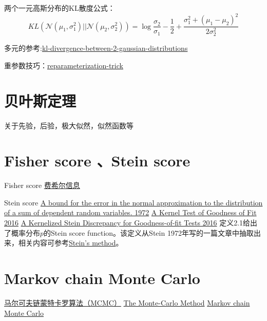 两个一元高斯分布的KL散度公式：
\begin{equation}
K L\left(\mathcal{N}\left(\mu_1, \sigma_1^2\right)||
\mathcal{N}\left(\mu_2, \sigma_2^2\right)\right)=
\log \frac{\sigma_2}{\sigma_1}-\frac{1}{2}+\frac{\sigma_1^2+
\left(\mu_1-\mu_2\right)^2}{2 \sigma_2^2}
\end{equation}

多元的参考:\href{https://mr-easy.github.io/2020-04-16-kl-divergence-between-2-gaussian-distributions/}{kl-divergence-between-2-gaussian-distributions}

重参数技巧：\href{https://lilianweng.github.io/posts/2018-08-12-vae/#reparameterization-trick}{reparameterization-trick}

\section{贝叶斯定理}
关于先验，后验，极大似然，似然函数等

\section{Fisher score 、Stein score}
Fisher score
\href{https://zh.wikipedia.org/wiki/%E8%B4%B9%E5%B8%8C%E5%B0%94%E4%BF%A1%E6%81%AF}{费希尔信息}

Stein score
\href{https://projecteuclid.org/ebooks/berkeley-symposium-on-mathematical-statistics-and-probability/Proceedings-of-the-Sixth-Berkeley-Symposium-on-Mathematical-Statistics-and/chapter/A-bound-for-the-error-in-the-normal-approximation-to/bsmsp/1200514239}{A bound for the error in the normal approximation to
the distribution of a sum of dependent random variables. 1972}
\href{http://proceedings.mlr.press/v48/chwialkowski16.pdf}{A Kernel Test of Goodness of Fit 2016}
\href{https://arxiv.org/pdf/1602.03253.pdf}{A Kernelized Stein Discrepancy for Goodness-of-fit Tests 2016}
定义2.1给出了概率分布$p$的Stein score function。该定义从Stein 1972年写的一篇文章中抽取出来，相关内容可参考\href{https://en.wikipedia.org/wiki/Stein%27s_method}{Stein's method}。


\section{Markov chain Monte Carlo}
\href{https://zhuanlan.zhihu.com/p/37121528}{马尔可夫链蒙特卡罗算法（MCMC）}
\href{https://web.math.ucsb.edu/~atzberg/pmwiki_intranet/uploads/AtzbergerHomePage/Atzberger_MonteCarlo.pdf}{The Monte-Carlo Method}
\href{https://en.wikipedia.org/wiki/Markov_chain_Monte_Carlo}{Markov chain Monte Carlo}

